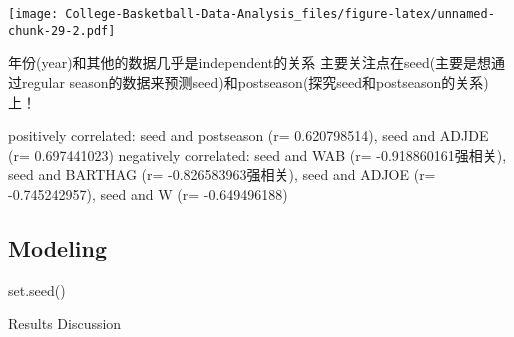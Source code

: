 \documentclass[
]{article}
\begin{document}
\texttt{[image: College-Basketball-Data-Analysis\_files/figure-latex/unnamed-chunk-29-2.pdf]}

年份(year)和其他的数据几乎是independent的关系
主要关注点在seed(主要是想通过regular
season的数据来预测seed)和postseason(探究seed和postseason的关系)上！

positively correlated: seed and postseason (r= 0.620798514), seed and
ADJDE (r= 0.697441023) negatively correlated: seed and WAB (r=
-0.918860161强相关), seed and BARTHAG (r= -0.826583963强相关), seed and
ADJOE (r= -0.745242957), seed and W (r= -0.649496188)

\hypertarget{modeling}{%
\subsection{Modeling}\label{modeling}}

set.seed()

Results Discussion
\end{document}
